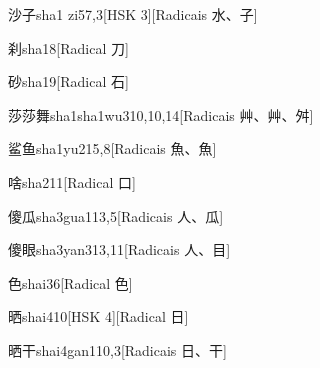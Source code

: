 \begin{entry}{沙子}{sha1 zi5}{7,3}[HSK 3][Radicais ⽔、⼦]
\end{entry}

\begin{entry}{刹}{sha1}{8}[Radical ⼑]
\end{entry}

\begin{entry}{砂}{sha1}{9}[Radical ⽯]
\end{entry}

\begin{entry}{莎莎舞}{sha1sha1wu3}{10,10,14}[Radicais ⾋、⾋、⾇]
\end{entry}

\begin{entry}{鲨鱼}{sha1yu2}{15,8}[Radicais ⿂、⿂]
\end{entry}

\begin{entry}{啥}{sha2}{11}[Radical ⼝]
\end{entry}

\begin{entry}{傻瓜}{sha3gua1}{13,5}[Radicais ⼈、⽠]
\end{entry}

\begin{entry}{傻眼}{sha3yan3}{13,11}[Radicais ⼈、⽬]
\end{entry}

\begin{entry}{色}{shai3}{6}[Radical ⾊]
\end{entry}

\begin{entry}{晒}{shai4}{10}[HSK 4][Radical ⽇]
\end{entry}

\begin{entry}{晒干}{shai4gan1}{10,3}[Radicais ⽇、⼲]
\end{entry}

